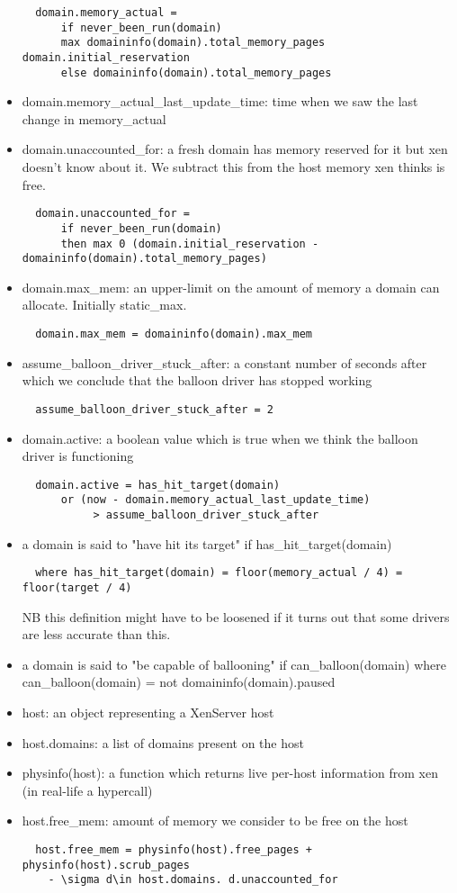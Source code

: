 \begin{itemize}
\begin{verbatim}
  domain.memory_actual = 
      if never_been_run(domain)
      max domaininfo(domain).total_memory_pages domain.initial_reservation
      else domaininfo(domain).total_memory_pages
\end{verbatim}
\item domain.memory\_actual\_last\_update\_time: time when we saw the last change in memory\_actual
\item domain.unaccounted\_for: a fresh domain has memory reserved for it but xen doesn't know about it. We subtract this from the host memory xen thinks is free.
\begin{verbatim}
  domain.unaccounted_for =
      if never_been_run(domain)
      then max 0 (domain.initial_reservation - domaininfo(domain).total_memory_pages)
\end{verbatim}
\item domain.max\_mem: an upper-limit on the amount of memory a domain can allocate. Initially static\_max.
\begin{verbatim}
  domain.max_mem = domaininfo(domain).max_mem
\end{verbatim}
\item assume\_balloon\_driver\_stuck\_after: a constant number of seconds after which we conclude that the balloon driver has stopped working
\begin{verbatim}
  assume_balloon_driver_stuck_after = 2
\end{verbatim}
\item domain.active: a boolean value which is true when we think the balloon driver is functioning
\begin{verbatim}
  domain.active = has_hit_target(domain) 
      or (now - domain.memory_actual_last_update_time) 
           > assume_balloon_driver_stuck_after
\end{verbatim}
\item a domain is said to "have hit its target" if has\_hit\_target(domain)
\begin{verbatim}
  where has_hit_target(domain) = floor(memory_actual / 4) = floor(target / 4)
\end{verbatim}
  NB this definition might have to be loosened if it turns out that some drivers are less accurate than this.
\item a domain is said to "be capable of ballooning" if can\_balloon(domain)
  where can\_balloon(domain) = not domaininfo(domain).paused


\item host: an object representing a XenServer host
\item host.domains: a list of domains present on the host
\item physinfo(host): a function which returns live per-host information from xen (in real-life a hypercall)
\item host.free\_mem: amount of memory we consider to be free on the host
\begin{verbatim}
  host.free_mem = physinfo(host).free_pages + physinfo(host).scrub_pages 
    - \sigma d\in host.domains. d.unaccounted_for
\end{verbatim}
\end{itemize}

